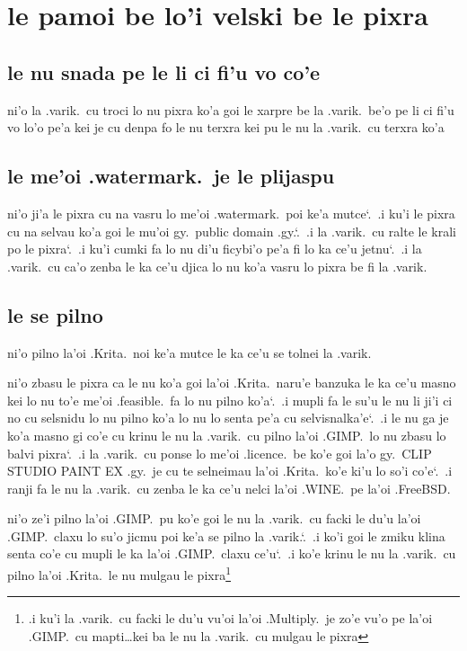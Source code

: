 \documentclass{report}
\newcommand\sds{\spacefactor\sfcode`.\ \space}
\begin{document}
\section{le pamoi be lo'i velski be le pixra}
\subsection{le nu snada pe le li ci fi'u vo co'e}
ni'o la .varik.\ cu troci lo nu pixra ko'a goi le xarpre be la .varik.\ be'o pe li ci fi'u vo lo'o pe'a kei je cu denpa fo le nu terxra kei pu le nu la .varik.\ cu terxra ko'a

\subsection{le me'oi .watermark.\ je le plijaspu}
ni'o ji'a le pixra cu na vasru lo me'oi .watermark.\ poi ke'a mutce\sds  .i ku'i le pixra cu na selvau ko'a goi le mu'oi gy.\ public domain .gy.\sds  .i la .varik.\ cu ralte le krali po le pixra\sds  .i ku'i cumki fa lo nu di'u ficybi'o pe'a fi lo ka ce'u jetnu\sds  .i la .varik.\ cu ca'o zenba le ka ce'u djica lo nu ko'a vasru lo pixra be fi la .varik.

\subsection{le se pilno}
ni'o pilno la'oi .Krita.\ noi ke'a mutce le ka ce'u se tolnei la .varik.

ni'o zbasu le pixra ca le nu ko'a goi la'oi .Krita.\ naru'e banzuka le ka ce'u masno kei lo nu to'e me'oi .feasible.\ fa lo nu pilno ko'a\sds  .i mupli fa le su'u le nu li ji'i ci no cu selsnidu lo nu pilno ko'a lo nu lo senta pe'a cu selvisnalka'e\sds  .i le nu ga je ko'a masno gi co'e cu krinu le nu la .varik.\ cu pilno la'oi .GIMP.\ lo nu zbasu lo balvi pixra\sds  .i la .varik.\ cu ponse lo me'oi .licence.\ be ko'e goi la'o gy.\ CLIP STUDIO PAINT EX .gy.\ je cu te selneimau la'oi .Krita.\ ko'e ki'u lo so'i co'e\sds  .i ranji fa le nu la .varik.\ cu zenba le ka ce'u nelci la'oi .WINE.\ pe la'oi .FreeBSD.

ni'o ze'i pilno la'oi .GIMP.\ pu ko'e goi le nu la .varik.\ cu facki le du'u la'oi .GIMP.\ claxu lo su'o jicmu poi ke'a se pilno la .varik.\sds  .i ko'i goi le zmiku klina senta co'e cu mupli le ka la'oi .GIMP.\ claxu ce'u\sds  .i ko'e krinu le nu la .varik.\ cu pilno la'oi .Krita.\ le nu mulgau le pixra\footnote{.i ku'i la .varik.\ cu facki le du'u vu'oi la'oi .Multiply.\ je zo'e vu'o pe la'oi .GIMP.\ cu mapti\ldots kei ba le nu la .varik.\ cu mulgau le pixra}
\end{document}
